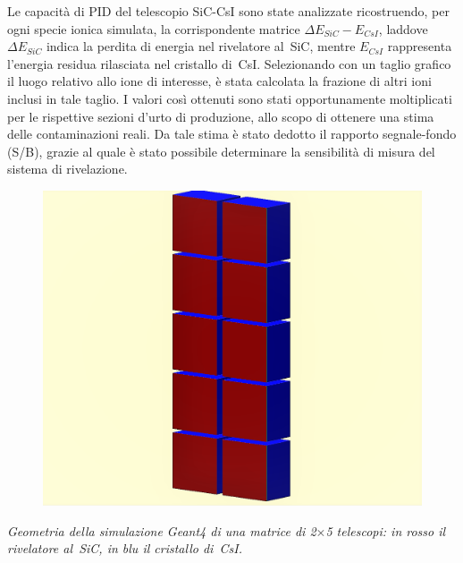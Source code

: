 \documentclass[10pt,foldmark]{leaflet}
\newcommand{\geant}{Geant4}
\begin{document}

Le capacità di PID del telescopio SiC-CsI sono state analizzate ricostruendo, per ogni specie ionica simulata, la corrispondente matrice $\Delta E_{SiC} - E_{CsI}$, laddove $\Delta E_{SiC}$ indica la perdita di energia nel rivelatore al~SiC, mentre $E_{CsI}$ rappresenta l'energia residua rilasciata nel cristallo di~CsI.
Selezionando con un taglio grafico il luogo relativo allo ione di interesse, è stata calcolata la frazione di altri ioni inclusi in tale taglio.
I valori così ottenuti sono stati opportunamente moltiplicati per le rispettive sezioni d'urto di produzione, allo scopo di ottenere una stima delle contaminazioni reali.
Da tale stima è stato dedotto il rapporto segnale-fondo (S/B), grazie al quale è stato possibile determinare la sensibilità di misura del sistema di rivelazione.

\begin{figure} [!h]
	\centering
	\includegraphics[width=0.5\columnwidth, keepaspectratio]{Grafici/modulo2_ritagliato.png}
\end{figure}
\textit{Geometria della simulazione \geant{} di una matrice di 2$\times$5 telescopi: in rosso il rivelatore al~SiC, in blu il cristallo di~CsI.}
\end{document}
